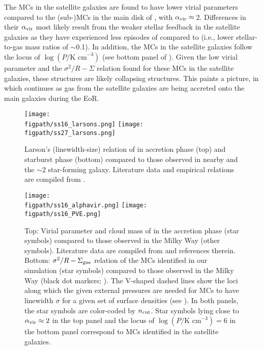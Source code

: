\IfFileExists{emulateapjlegacy.cls}{\documentclass[iop]{emulateapjlegacy}}{\documentclass[iop]{emulateapj}}
\begin{document}
The MCs in the satellite galaxies are found to have
lower virial parameters compared to the (sub-)MCs in the main disk of \flower,
with $\alpha_{\rm vir}\approx$\,2.
Differences in their $\alpha_{\rm vir}$ most likely result from the weaker
stellar feedback in the satellite galaxies as they have experienced less episodes of \SF compared to
\flower (i.e., lower stellar-to-gas mass ratios of $\sim$0.1). 
In addition, the MCs in the satellite galaxies follow the locus of 
$\log{(P/\textrm{K cm}^{-3})}$ (see bottom panel of ). 
Given the low virial parameter and the $\sigma^2/R - \Sigma$ relation found for these MCs in the satellite galaxies, 
these structures are likely collapsing structures.
This paints a picture, in which \SF continues as gas from the satellite galaxies are being accreted onto the main galaxies during the EoR.

\begin{figure*}[htbp]
\centering
\texttt{[image: \\figpath/ss16\_larsons.png]}
\texttt{[image: \\figpath/ss27\_larsons.png]}
\caption{
Larson's (linewidth-size) relation of \flower in
accretion phase (top) and
starburst phase (bottom) compared to
those observed in nearby and the \z$\sim$2 star-forming galaxy.
Literature data and empirical relations are compiled from \citet{Larson81a, Heyer04a, Rosolowsky05a, Bolatto08a, Swinbank11a, Leroy15a}.
\label{fig:larsons_single}}
\end{figure*}


\begin{figure}[htbp]
\centering
\texttt{[image: \\figpath/ss16\_alphavir.png]}
\texttt{[image: \\figpath/ss16\_PVE.png]}
\caption{
Top: Virial parameter and cloud mass of \flower in the accretion phase (star symbols) compared to those observed in the Milky Way 
(other symbols).
Literature data are compiled from \citealt{Kauffmann17b} and references therein.
Bottom: $\sigma^2/R - \Sigma_{\rm gas}$ relation of the MCs identified in our simulation (star symbols) 
compared to those observed in the Milky Way (black dot markers; \citealt{Heyer09a}).
The V-shaped dashed lines show the loci along which the given external pressures
are needed for MCs to have linewidth $\sigma$ for a given set of surface densities (see ).
In both panels, the star symbols are color-coded by $n_{\rm cut}$.
Star symbols lying close to $\alpha_{\rm vir}\approx2$ in the top panel  
and the locus of $\log{(P/\textrm{K cm}^{-3}) = 6}$ in the bottom panel correspond to MCs identified in the satellite galaxies.
\label{fig:alpha16}}
\end{figure}
\end{document}
